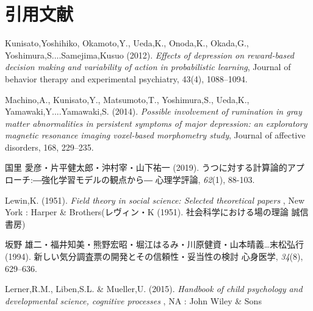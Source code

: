 \hypertarget{ux5f15ux7528ux6587ux732e}{%
    \section{引用文献}\label{ux5f15ux7528ux6587ux732e}}
\hypertarget{refs}{}
    \leavevmode\hypertarget{ref-Kunisato2012}{}%
Kunisato,Yoshihiko, Okamoto,Y., Ueda,K., Onoda,K., Okada,G., Yoshimura,S....Samejima,Kusuo (2012). \emph{Effects of depression on reward-based decision making and variability of action in probabilistic learning}, Journal of behavior therapy and experimental psychiatry, 43(4), 1088--1094.


\hypertarget{refs}{}
    \leavevmode\hypertarget{ref-Machino2014}{}%
Machino,A., Kunisato,Y., Matsumoto,T., Yoshimura,S., Ueda,K., Yamawaki,Y....Yamawaki,S. (2014). \emph{Possible involvement of rumination in gray matter abnormalities in persistent symptoms of major depression: an exploratory magnetic resonance imaging voxel-based morphometry study}, Journal of affective disorders, 168, 229--235.


\hypertarget{refs}{}
    \leavevmode\hypertarget{ref-kunisato2019}{}%
国里 愛彦・片平健太郎・沖村宰・山下祐一 (2019). うつに対する計算論的アプローチ:―強化学習モデルの観点から― 心理学評論, \emph{62}(1), 88-103.


\hypertarget{refs}{}
    \leavevmode\hypertarget{ref-Lewin}{}%
Lewin,K. (1951). \emph{Field theory in social science: Selected theoretical papers} , New York : Harper \& Brothers(レヴィン・K (1951). 社会科学における場の理論 誠信書房)


\hypertarget{refs}{}
    \leavevmode\hypertarget{ref-ux5742ux91ceux96c4ux4e8c1994}{}%
坂野 雄二・福井知美・熊野宏昭・堀江はるみ・川原健資・山本晴義…末松弘行 (1994). 新しい気分調査票の開発とその信頼性・妥当性の検討 心身医学, \emph{34}(8), 629--636.


\hypertarget{refs}{}
    \leavevmode\hypertarget{ref-lerner2015handbook}{}%
Lerner,R.M., Liben,S.L. \& Mueller,U. (2015). \emph{Handbook of child psychology and developmental science, cognitive processes} , NA : John Wiley \& Sons


